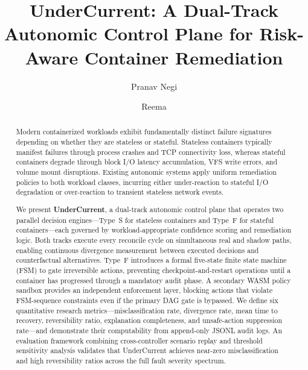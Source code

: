 \documentclass[runningheads]{llncs}
\begin{document}
\title{UnderCurrent: A Dual-Track Autonomic Control Plane for Risk-Aware Container Remediation}


\author{Pranav Negi \and
Reema}



\maketitle

\begin{abstract}
Modern containerized workloads exhibit fundamentally distinct failure
signatures depending on whether they are stateless or stateful.
Stateless containers typically manifest failures through process crashes
and TCP connectivity loss, whereas stateful containers degrade through
block I/O latency accumulation, VFS write errors, and volume mount
disruptions. Existing autonomic systems apply uniform remediation
policies to both workload classes, incurring either under-reaction to
stateful I/O degradation or over-reaction to transient stateless
network events.

We present \textbf{UnderCurrent}, a dual-track autonomic control plane
that operates two parallel decision engines---Type~S for stateless
containers and Type~F for stateful containers---each governed by
workload-appropriate confidence scoring and remediation logic. Both
tracks execute every reconcile cycle on simultaneous real and shadow
paths, enabling continuous divergence measurement between executed
decisions and counterfactual alternatives. Type~F introduces a formal
five-state finite state machine (FSM) to gate irreversible actions,
preventing checkpoint-and-restart operations until a container has
progressed through a mandatory audit phase. A secondary WASM policy
sandbox provides an independent enforcement layer, blocking actions
that violate FSM-sequence constraints even if the primary DAG gate is
bypassed. We define six quantitative research metrics---misclassification
rate, divergence rate, mean time to recovery, reversibility ratio,
explanation completeness, and unsafe-action suppression rate---and
demonstrate their computability from append-only JSONL audit logs.
An evaluation framework combining cross-controller scenario replay and
threshold sensitivity analysis validates that UnderCurrent achieves
near-zero misclassification and high reversibility ratios across the
full fault severity spectrum.

\end{abstract}
\end{document}
